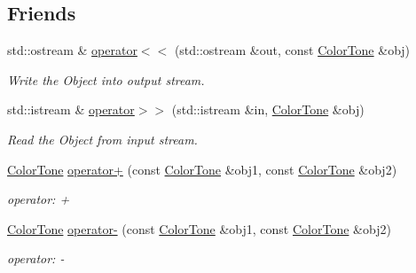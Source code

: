 \subsection*{Friends}
\begin{DoxyCompactItemize}
\item 
std::ostream \& \hyperlink{class_f2_c_1_1_color_tone_ac6fd7bc24f09bd1a89d9cdb6643f3b56}{operator$<$$<$} (std::ostream \&out, const \hyperlink{class_f2_c_1_1_color_tone}{ColorTone} \&obj)
\begin{DoxyCompactList}\small\item\em Write the Object into output stream. \item\end{DoxyCompactList}\item 
std::istream \& \hyperlink{class_f2_c_1_1_color_tone_a1cac8e47aa6784e89ae489d667d7f75b}{operator$>$$>$} (std::istream \&in, \hyperlink{class_f2_c_1_1_color_tone}{ColorTone} \&obj)
\begin{DoxyCompactList}\small\item\em Read the Object from input stream. \item\end{DoxyCompactList}\item 
\hypertarget{class_f2_c_1_1_color_tone_aa1ef5327755c9fe9246cc286cac1ca87}{
\hyperlink{class_f2_c_1_1_color_tone}{ColorTone} \hyperlink{class_f2_c_1_1_color_tone_aa1ef5327755c9fe9246cc286cac1ca87}{operator+} (const \hyperlink{class_f2_c_1_1_color_tone}{ColorTone} \&obj1, const \hyperlink{class_f2_c_1_1_color_tone}{ColorTone} \&obj2)}
\label{class_f2_c_1_1_color_tone_aa1ef5327755c9fe9246cc286cac1ca87}

\begin{DoxyCompactList}\small\item\em operator: + \item\end{DoxyCompactList}\item 
\hypertarget{class_f2_c_1_1_color_tone_a215e91cf5d81e2c7714b6d722138abc3}{
\hyperlink{class_f2_c_1_1_color_tone}{ColorTone} \hyperlink{class_f2_c_1_1_color_tone_a215e91cf5d81e2c7714b6d722138abc3}{operator-\/} (const \hyperlink{class_f2_c_1_1_color_tone}{ColorTone} \&obj1, const \hyperlink{class_f2_c_1_1_color_tone}{ColorTone} \&obj2)}
\label{class_f2_c_1_1_color_tone_a215e91cf5d81e2c7714b6d722138abc3}

\begin{DoxyCompactList}\small\item\em operator: -\/ \item\end{DoxyCompactList}\end{DoxyCompactItemize}


